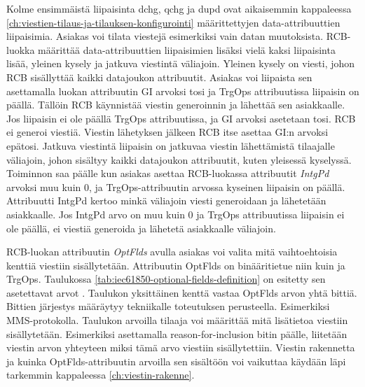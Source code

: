 Kolme ensimmäistä liipaisinta dchg, qchg ja dupd ovat aikaisemmin kappaleessa \ref{ch:viestien-tilaus-ja-tilauksen-konfigurointi} määrittettyjen data-attribuuttien liipaisimia. Asiakas voi tilata viestejä esimerkiksi vain datan muutoksista. RCB-luokka määrittää data-attribuuttien liipaisimien lisäksi vielä kaksi liipaisinta lisää, yleinen kysely ja jatkuva viestintä väliajoin. Yleinen kysely on viesti, johon RCB sisällyttää kaikki datajoukon attribuutit. Asiakas voi liipaista sen asettamalla luokan attribuutin GI arvoksi tosi ja TrgOps attribuutissa liipaisin on päällä. Tällöin RCB käynnistää viestin generoinnin ja lähettää sen asiakkaalle. Jos liipaisin ei ole päällä TrgOps attribuutissa, ja GI arvoksi asetetaan tosi. RCB ei generoi viestiä. Viestin lähetyksen jälkeen RCB itse asettaa GI:n arvoksi epätosi. Jatkuva viestintä liipaisin on jatkuvaa viestin lähettämistä tilaajalle väliajoin, johon sisältyy kaikki datajoukon attribuutit, kuten yleisessä kyselyssä. Toiminnon saa päälle kun asiakas asettaa RCB-luokassa attribuutit \emph{IntgPd} arvoksi muu kuin 0, ja TrgOps-attribuutin arvossa kyseinen liipaisin on päällä. Attribuutti IntgPd kertoo minkä väliajoin viesti generoidaan ja lähetetään asiakkaalle. Jos IntgPd arvo on muu kuin 0 ja TrgOps attribuutissa liipaisin ei ole päällä, ei viestiä generoida ja lähetetä asiakkaalle väliajoin.

RCB-luokan attribuutin \emph{OptFlds} avulla asiakas voi valita mitä vaihtoehtoisia kenttiä viestiin sisällytetään. Attribuutin OptFlds on binääritietue niin kuin ja TrgOps. Taulukossa \ref{tab:iec61850-optional-fields-definition} on esitetty sen asetettavat arvot \mbox{\cite[s.~98]{IEC61850-7-2}}. Taulukon yksittäinen kenttä vastaa OptFlds arvon yhtä bittiä. Bittien järjestys määräytyy tekniikalle toteutuksen perusteella. Esimerkiksi MMS-protokolla. Taulukon arvoilla tilaaja voi määrittää mitä lisätietoa viestiin sisällytetään. Esimerkiksi asettamalla reason-for-inclusion bitin päälle, liitetään viestin arvon yhteyteen miksi tämä arvo viestiin sisällytettiin. Viestin rakennetta ja kuinka OptFlds-attribuutin arvoilla sen sisältöön voi vaikuttaa käydään läpi tarkemmin kappaleessa \ref{ch:viestin-rakenne}.

